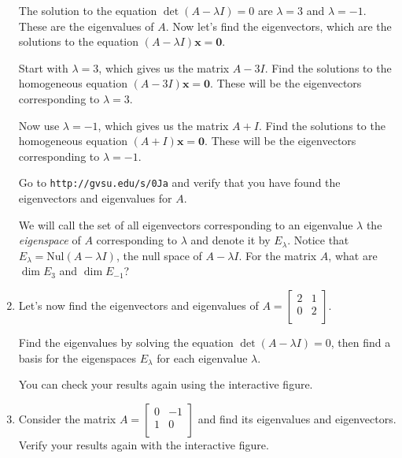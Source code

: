 \documentclass[12pt]{article}
\newcommand{\vs}[1]{\vspace{#1in}}
\newcommand{\xvec}{{\mathbf x}}
\newcommand{\zerovec}{{\mathbf 0}}
\newcommand{\nul}{\text{Nul}}
\begin{document}
\begin{enumerate}
  \vs{1}
  
  \newpage
  The solution to the equation $\det(A-\lambda I) = 0$ are $\lambda =
  3$ and $\lambda = -1$.  These are the eigenvalues of $A$.  Now let's
  find the eigenvectors, which are the solutions to the equation
  $(A-\lambda I)\xvec = \zerovec$.

  Start with $\lambda = 3$, which gives us the matrix $A-3I$.  Find
  the solutions to the homogeneous equation $(A-3I)\xvec = \zerovec$.
  These will be the eigenvectors corresponding to $\lambda = 3$.

  \vs{1.5}
  Now use $\lambda = -1$, which gives us the matrix $A+I$.  Find the
  solutions to the homogeneous equation $(A+I)\xvec = \zerovec$.
  These will be the eigenvectors corresponding to $\lambda = -1$.

  \vs{1.5}
  Go to {\tt http://gvsu.edu/s/0Ja} and verify that you have found the
  eigenvectors and eigenvalues for $A$.

  \bigskip
  We will call the set of all eigenvectors corresponding to an
  eigenvalue $\lambda$ the {\em eigenspace} of $A$ corresponding to
  $\lambda$ and denote it by $E_\lambda$.  Notice that
  $E_\lambda = \nul(A-\lambda I)$, the null space of $A-\lambda I$.
  For the matrix $A$, what are $\dim E_3$ and $\dim E_{-1}$?

  \vs{1}
  \newpage
\item Let's now find the eigenvectors and eigenvalues of
  $A =
  \left[
    \begin{array}{cc}
      2 & 1 \\
      0 & 2 \\
    \end{array}
  \right]
  $.

  Find the eigenvalues by solving the equation $\det(A-\lambda I) =
  0$, then find a basis for the eigenspaces $E_\lambda$ for each
  eigenvalue $\lambda$.

  \vs{2}
  You can check your results again using the interactive figure.

\item Consider the matrix
  $A =
  \left[
    \begin{array}{cc}
      0 & -1 \\
      1 & 0 \\
    \end{array}
  \right]
  $ and find its eigenvalues and eigenvectors.  Verify your results
  again with the interactive figure.

  \vs{1}
  

\end{enumerate}
\end{document}
